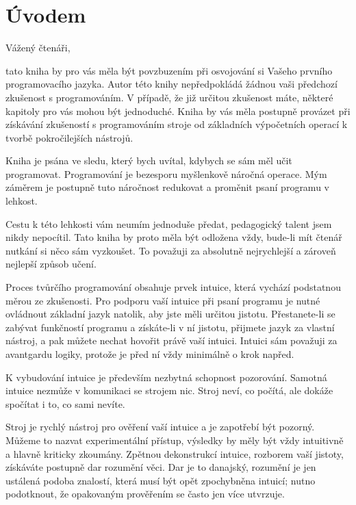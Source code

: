 \documentclass[10pt]{book}
\newcommand{\oddil}[1]{\section{#1}\index{#1}\label{#1}}
\begin{document}
\vfill
\thispagestyle{empty}



\oddil{Úvodem}




Vážený čtenáři,

tato kniha by pro vás měla být povzbuzením při osvojování si Vašeho prvního programovacího jazyka. Autor této knihy nepředpokládá žádnou vaši předchozí zkušenost s programováním. V případě, že již určitou zkušenost máte, některé kapitoly pro vás mohou být jednoduché. Kniha by vás měla postupně provázet při získávání zkušeností s programováním stroje od základních výpočetních operací k tvorbě pokročilejších nástrojů.

Kniha je psána ve sledu, který bych uvítal, kdybych se sám měl učit programovat. Programování je bezesporu myšlenkově náročná operace. Mým záměrem je postupně tuto náročnost redukovat a proměnit psaní programu v lehkost.

Cestu k této lehkosti vám neumím jednoduše předat, pedagogický talent jsem nikdy nepocítil. Tato kniha by proto měla být odložena vždy, bude-li mít čtenář nutkání si něco sám vyzkoušet. To považuji za absolutně nejrychlejší a zároveň nejlepší způsob učení.

Proces tvůrčího programování obsahuje prvek intuice, která vychází podstatnou měrou ze zkušenosti. Pro podporu vaší intuice při psaní programu je nutné ovládnout základní jazyk natolik, aby jste měli určitou jistotu. Přestanete-li se zabývat funkčností programu a získáte-li v ní jistotu, přijmete jazyk za vlastní nástroj, a pak můžete nechat hovořit právě vaší intuici. Intuici sám považuji za avantgardu logiky, protože je před ní vždy minimálně o krok napřed.

K vybudování intuice je především nezbytná schopnost pozorování. Samotná intuice nezmůže v komunikaci se strojem nic. Stroj neví, co počítá, ale dokáže spočítat i to, co sami nevíte.

Stroj je rychlý nástroj pro ověření vaší intuice a je zapotřebí být pozorný. Můžeme to nazvat experimentální přístup, výsledky by měly být vždy intuitivně a hlavně kriticky zkoumány. Zpětnou dekonstrukcí intuice, rozborem vaší jistoty, získáváte postupně dar rozumění věci. Dar je to danajský, rozumění je jen ustálená podoba znalostí, která musí být opět zpochybněna intuicí; nutno podotknout, že opakovaným prověřením se často jen více utvrzuje. 
\end{document}
